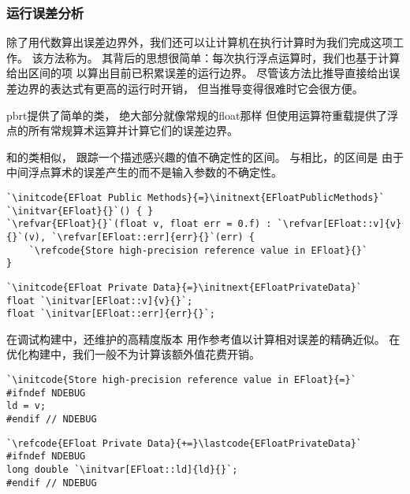 \subsubsection*{运行误差分析}
除了用代数算出误差边界外，我们还可以让计算机在执行计算时为我们完成这项工作。
该方法称为。
其背后的思想很简单：每次执行浮点运算时，我们也基于计算给出区间的项
以算出目前已积累误差的运行边界。
尽管该方法比推导直接给出误差边界的表达式有更高的运行时开销，
但当推导变得很难时它会很方便。

pbrt提供了简单的类，
绝大部分就像常规的{\ttfamily float}那样
但使用运算符重载提供了浮点的所有常规算术运算并计算它们的误差边界。

和的类相似，
跟踪一个描述感兴趣的值不确定性的区间。
与相比，的区间是
由于中间浮点算术的误差产生的而不是输入参数的不确定性。
\begin{lstlisting}
`\initcode{EFloat Public Methods}{=}\initnext{EFloatPublicMethods}`
`\initvar{EFloat}{}`() { }
`\refvar{EFloat}{}`(float v, float err = 0.f) : `\refvar[EFloat::v]{v}{}`(v), `\refvar[EFloat::err]{err}{}`(err) {
    `\refcode{Store high-precision reference value in EFloat}{}`
}
\end{lstlisting}

\begin{lstlisting}
`\initcode{EFloat Private Data}{=}\initnext{EFloatPrivateData}`
float `\initvar[EFloat::v]{v}{}`;
float `\initvar[EFloat::err]{err}{}`;
\end{lstlisting}

在调试构建中，还维护的高精度版本
用作参考值以计算相对误差的精确近似。
在优化构建中，我们一般不为计算该额外值花费开销。
\begin{lstlisting}
`\initcode{Store high-precision reference value in EFloat}{=}`
#ifndef NDEBUG
ld = v;
#endif // NDEBUG
\end{lstlisting}
\begin{lstlisting}
`\refcode{EFloat Private Data}{+=}\lastcode{EFloatPrivateData}`
#ifndef NDEBUG
long double `\initvar[EFloat::ld]{ld}{}`;
#endif // NDEBUG
\end{lstlisting}

